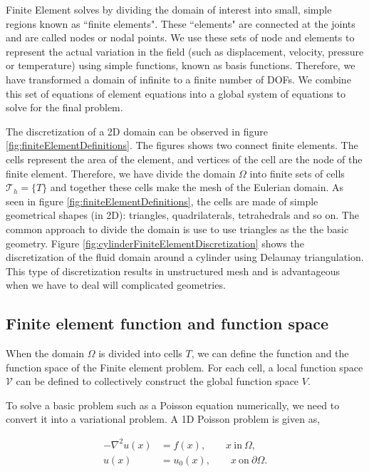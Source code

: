 Finite Element solves by dividing the domain of interest into small, simple regions known as ``finite elements". These ``elements" are connected at the joints and are called nodes or nodal points. We use these sets of node and elements to represent the actual variation in the field (such as displacement, velocity, pressure or temperature) using simple functions, known as basis functions. Therefore, we have transformed a domain of infinite  to a finite number of DOFs. We combine this set of equations of element equations into a global system of equations to solve for the final problem.

The discretization of a 2D domain can be observed in figure \ref{fig:finiteElementDefinitions}. The figures shows two connect finite elements. The cells represent the area of the element, and vertices of the cell are the node of the finite element. Therefore, we have divide the domain $\Omega$ into finite sets of cells $\mathcal{T}_h = \{T\}$ and together these cells make the mesh of the Eulerian domain. As seen in figure \ref{fig:finiteElementDefinitions}, the cells are made of simple geometrical shapes (in 2D): triangles, quadrilaterals, tetrahedrals and so on. The common approach to divide the domain is use to use triangles as the the basic geometry. Figure \ref{fig:cylinderFiniteElementDiscretization} shows the discretization of the fluid domain around a cylinder using Delaunay triangulation. This type of discretization results in unstructured mesh and is advantageous when we have to deal will complicated geometries. 

\subsection*{Finite element function and function space}

When the domain $\Omega$ is divided into cells $T$, we can define the function and the function space of the Finite element problem. For each cell, a local function space $\mathcal{V}$ can be defined to collectively construct the global function space $V$.

To solve a basic problem such as a Poisson equation numerically, we need to convert it into a variational problem. A 1D Poisson problem is given as,

	\begin{subequations}
	\begin{align*}
	- \nabla^2 u(x) &= f(x), \qquad x\ \mathrm{in}\ \Omega,\\
	u(x) &= u_0(x), \qquad x\ \mathrm{on}\ \partial\Omega.
	\end{align*}
	\label{eq:poissonEq}
	\end{subequations}
	
